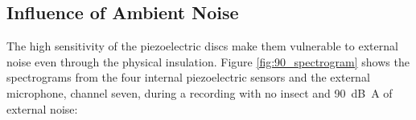 



\subsection{Influence of Ambient Noise}

The high sensitivity of the piezoelectric discs make them vulnerable to external noise even through the physical insulation. Figure \ref{fig:90_spectrogram} shows the spectrograms from the four internal piezoelectric sensors and the external microphone, channel seven, during a recording with no insect and \SI{90}{\deci\bel A} of external noise: 

